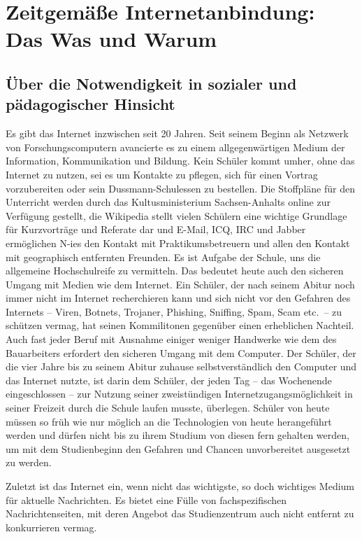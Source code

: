 \documentclass[10pt,a4paper,notitlepage]{scrartcl}
\begin{document}
\setlength{\columnsep}{1cm}
\section{Zeitgemäße Internetanbindung: Das Was und Warum}
\subsection{Über die Notwendigkeit in sozialer und pädagogischer Hinsicht}
\begin{multicols}{2}
Es gibt das Internet inzwischen seit 20 Jahren. Seit seinem Beginn als Netzwerk von Forschungscomputern avancierte es zu einem allgegenwärtigen Medium der Information, Kommunikation und Bildung. Kein Schüler kommt umher, ohne das Internet zu nutzen, sei es um Kontakte zu pflegen, sich für einen Vortrag vorzubereiten oder sein Dussmann-Schulessen zu bestellen. Die Stoffpläne für den Unterricht werden durch das Kultusministerium Sachsen-Anhalts online zur Verfügung gestellt, die Wikipedia stellt vielen Schülern eine wichtige Grundlage für Kurzvorträge und Referate dar und E-Mail, ICQ, IRC und Jabber ermöglichen N-ies den Kontakt mit Praktikumsbetreuern und allen den Kontakt mit geographisch entfernten Freunden.
Es ist Aufgabe der Schule, uns die allgemeine Hochschulreife zu vermitteln. Das bedeutet heute auch den sicheren Umgang mit Medien wie dem Internet. Ein Schüler, der nach seinem Abitur noch immer nicht im Internet recherchieren kann und sich nicht vor den Gefahren des Internets -- Viren, Botnets, Trojaner, Phishing, Sniffing, Spam, Scam etc.\ -- zu schützen vermag, hat seinen Kommilitonen gegenüber einen erheblichen Nachteil. Auch fast jeder Beruf mit Ausnahme einiger weniger Handwerke wie dem des Bauarbeiters erfordert den sicheren Umgang mit dem Computer. Der Schüler, der die vier Jahre bis zu seinem Abitur zuhause selbstverständlich den Computer und das Internet nutzte, ist darin dem Schüler, der jeden Tag -- das Wochenende eingeschlossen -- zur Nutzung seiner zweistündigen Internetzugangsmöglichkeit in seiner Freizeit durch die Schule laufen musste, überlegen. Schüler von heute müssen so früh wie nur möglich an die Technologien von heute herangeführt werden und dürfen nicht bis zu ihrem Studium von diesen fern gehalten werden, um mit dem Studienbeginn den Gefahren und Chancen unvorbereitet ausgesetzt zu werden.

Zuletzt ist das Internet ein, wenn nicht das wichtigste, so doch wichtiges Medium für aktuelle Nachrichten. Es bietet eine Fülle von fachspezifischen Nachrichtenseiten, mit deren Angebot das Studienzentrum auch nicht entfernt zu konkurrieren vermag.
\end{multicols}
\end{document}
